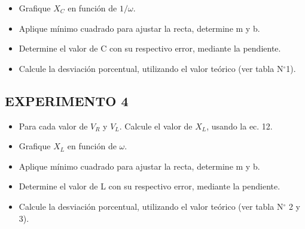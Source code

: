 \documentclass[11pt,a4paper]{article}
\begin{document}
\begin{itemize}[leftmargin=1.4em,itemsep=2pt,topsep=3pt]
  \item Grafique $X_C$ en función de $1/\omega$.
\end{itemize}

\begin{itemize}[leftmargin=1.4em,itemsep=2pt,topsep=3pt]
  \item Aplique mínimo cuadrado para ajustar la recta, determine m y b.
\end{itemize}

\begin{itemize}[leftmargin=1.4em,itemsep=2pt,topsep=3pt]
  \item Determine el valor de C con su respectivo error, mediante la pendiente.
\end{itemize}

\begin{itemize}[leftmargin=1.4em,itemsep=2pt,topsep=3pt]
  \item Calcule la desviación porcentual, utilizando el valor teórico (ver tabla N$^{\circ}$1).
\end{itemize}

\subsection*{EXPERIMENTO 4}

\begin{itemize}[leftmargin=1.4em,itemsep=2pt,topsep=3pt]
  \item Para cada valor de $V_R$ y $V_L$. Calcule el valor de $X_L$, usando la ec. 12.
\end{itemize}

\begin{itemize}[leftmargin=1.4em,itemsep=2pt,topsep=3pt]
  \item Grafique $X_L$ en función de $\omega$.
\end{itemize}

\begin{itemize}[leftmargin=1.4em,itemsep=2pt,topsep=3pt]
  \item Aplique mínimo cuadrado para ajustar la recta, determine m y b.
\end{itemize}

\begin{itemize}[leftmargin=1.4em,itemsep=2pt,topsep=3pt]
  \item Determine el valor de L con su respectivo error, mediante la pendiente.
\end{itemize}

\begin{itemize}[leftmargin=1.4em,itemsep=2pt,topsep=3pt]
  \item Calcule la desviación porcentual, utilizando el valor teórico (ver tabla N$^{\circ}$ 2 y 3).
\end{itemize}
\end{document}
